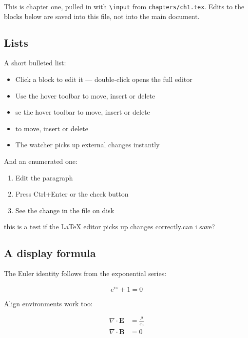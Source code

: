 This is chapter one, pulled in with \texttt{\textbackslash input} from
\texttt{chapters/ch1.tex}. Edits to the blocks below are saved into this
file, not into the main document.

\subsection{Lists}

A short bulleted list:
\begin{itemize}\item Click a block to edit it --- double-click opens the full editor
\item Use the hover toolbar to move, insert or delete
\item se the hover toolbar to move, insert or delete
\item to move, insert or delete
\item The watcher picks up external changes instantly
\end{itemize}

And an enumerated one:
\begin{enumerate}
  \item Edit the paragraph
  \item Press Ctrl+Enter or the check button
  \item See the change in the file on disk
\end{enumerate}

this is a test if the LaTeX editor picks up changes correctly.can i save?

\subsection{A display formula}

The Euler identity follows from the exponential series:

\begin{equation}
  e^{i\pi} + 1 = 0
\end{equation}

Align environments work too:

\begin{align}
  \nabla \cdot \mathbf{E} &= \frac{\rho}{\varepsilon_0} \\
  \nabla \cdot \mathbf{B} &= 0
\end{align}
































